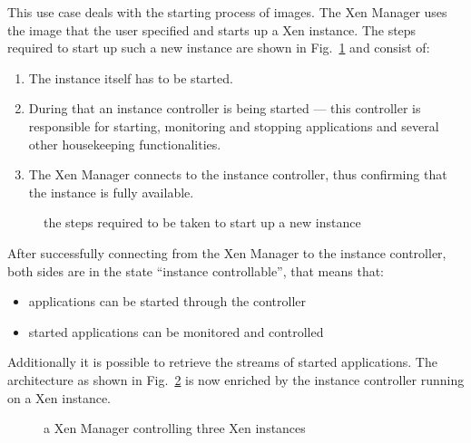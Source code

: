 This use case  deals with the starting process of  images. The Xen Manager
uses the image  that the user specified and starts up  a Xen instance. The
steps  required   to  start   up  such  a   new  instance  are   shown  in
Fig.~\ref{fig:seq-image-deployment-1} and consist of:
\begin{enumerate}
\item  The instance  itself has  to be  started.
\item  During  that an  instance  controller  is  being started  ---  this
  controller  is   responsible  for  starting,   monitoring  and  stopping
  applications and several other housekeeping functionalities.
\item The Xen Manager connects to the instance controller, thus confirming
  that the instance is fully available.
\end{enumerate}

\begin{figure}[htbp]
  \begin{center}
  \end{center}
  \caption[Image deployment sequence]{the steps required to be taken to
    start up a new instance}
  \label{fig:seq-image-deployment-1}
\end{figure}

After  successfully  connecting  from  the  Xen Manager  to  the  instance
controller, both  sides are in  the state ``instance  controllable'', that
means that:
\begin{itemize}
\item applications can be started through the controller
\item started applications can be monitored and controlled
\end{itemize}

Additionally  it   is  possible  to   retrieve  the  streams   of  started
applications.        The        architecture       as       shown       in
Fig.~\ref{fig:arch-deployment-1}   is  now   enriched   by  the   instance
controller running on a Xen instance.

\begin{figure}[htbp]
  \begin{center}
  \end{center}
  \caption[Image deployment architecture]{a Xen Manager controlling three
    Xen instances}
  \label{fig:arch-deployment-1}
\end{figure}


